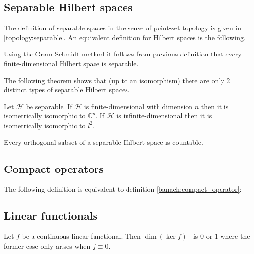 \subsection{Separable Hilbert spaces}

	The definition of separable spaces in the sense of point-set topology is given in \ref{topology:separable}. An equivalent definition for Hilbert spaces is the following.
	\begin{result}
		Using the Gram-Schmidt method it follows from previous definition that every finite-dimensional Hilbert space is separable.
	\end{result}

	The following theorem shows that (up to an isomorphism) there are only 2 distinct types of separable Hilbert spaces.
	\begin{theorem}
		Let $\mathcal{H}$ be separable. If $\mathcal{H}$ is finite-dimensional with dimension $n$ then it is isometrically isomorphic to $\mathbb{C}^n$. If $\mathcal{H}$ is infinite-dimensional then it is isometrically isomorphic to $l^2$.
	\end{theorem}
	\begin{property}
		Every orthogonal subset of a separable Hilbert space is countable.
	\end{property}

\subsection{Compact operators}

	The following definition is equivalent to definition \ref{banach:compact_operator}:

\subsection{Linear functionals}

	\begin{property}
		Let $f$ be a continuous linear functional. Then $\dim(\ker f)^\perp$ is 0 or 1 where the former case only arises when $f\equiv0$.
	\end{property}

